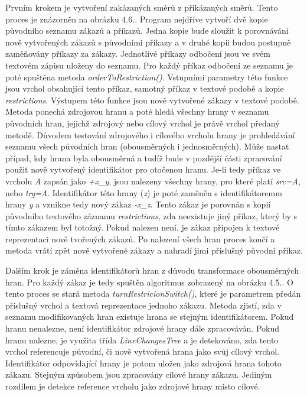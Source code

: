 Prvním krokem je vytvoření zakázaných směrů z přikázaných směrů. Tento proces je znázorněn na obrázku 4.6.. Program nejdříve vytvoří dvě kopie původního seznamu zákazů a příkazů. Jedna kopie bude sloužit k porovnávání nově vytvořených zákazů s původními příkazy a v druhé kopii budou postupně zaměňovány příkazy za zákazy. Jednotlivé příkazy odbočení jsou ve svém textovém zápisu uloženy do seznamu. Pro každý příkaz odbočení ze seznamu je poté spuštěna metoda \textit{orderToRestriction()}. Vstupními parametry této funkce jsou vrchol obsahující tento příkaz, samotný příkaz v textové podobě a kopie \textit{restrictions}. Výstupem této funkce jsou nově vytvořené zákazy v textové podobě. Metoda ponechá zdrojovou hranu a poté hledá všechny hrany v seznamu původních hran, jejichž zdrojový nebo cílový vrchol je právě vrchol předaný metodě. Důvodem testování zdrojového i cílového vrcholu hrany je prohledávání seznamu všech původních hran (obousměrných i jednosměrných). Může nastat případ, kdy hrana byla obousměrná a tudíž bude v pozdější části zpracování použit nově vytvořený identifikátor pro otočenou hranu. Je-li tedy příkaz ve vrcholu \textit{A} zapsán jako \textit{+x\_y}, jsou nalezeny všechny hrany, pro které platí \textit{src=A}, nebo \textit{trg=A}. Identifikátor této hrany (\textit{z}) je poté zaměněn s identifikátoremm hrany \textit{y} a vznikne tedy nový zákaz \textit{-x\_z}. Tento zákaz je porovnán s kopií původního textového záznamu \textit{restrictions}, zda neexistuje jiný příkaz, který by s tímto zákazem byl totožný. Pokud nalezen není, je zákaz připojen k textové reprezentaci nově tvořených zákazů. Po nalezení všech hran proces končí a metoda vrátí zpět nově vytvořené zákazy a nahradí jimi příslušný původní příkaz. 

Dalším krok je záměna identifikátorů hran z důvodu transformace obousměrných hran. Pro každý zákaz je tedy spuštěn algoritmus zobrazený na obrázku 4.5.. O tento proces se stará metoda \textit{turnRestricionSwitch()}, které je parametrem předán příslušný vrchol a textová reprezentace jednoho zákazu. Metoda zjistí, zda v seznamu modifikovaných hran existuje hrana se stejným identifikátorem. Pokud hranu nenalezne, není identifikátor zdrojové hrany dále zpracováván. Pokud hranu nalezne, je využita třída \textit{LineChangesTree} a je detekováno, zda tento vrchol referencuje původní, či nově vytvořená hrana jako svůj cílový vrchol. Identifikátor odpovídající hrany je potom uložen jako zdrojová hrana tohoto zákazu. Stejným způsobem jsou zpracovány cílové hrany zákazu. Jediným rozdílem je detekce reference vrcholu jako zdrojové hrany místo cílové. 

